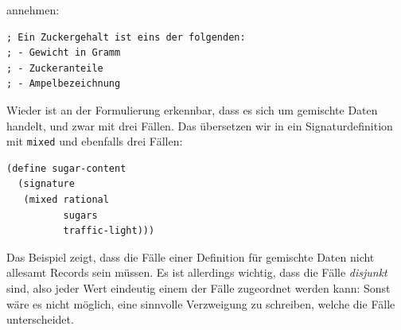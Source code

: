 annehmen:
%
\begin{verbatim}
; Ein Zuckergehalt ist eins der folgenden:
; - Gewicht in Gramm
; - Zuckeranteile
; - Ampelbezeichnung
\end{verbatim}
%
Wieder ist an der Formulierung erkennbar, dass es sich um gemischte
Daten handelt, und zwar mit drei Fällen.  Das übersetzen wir in ein
Signaturdefinition mit \texttt{mixed} und ebenfalls drei Fällen:
%
\begin{verbatim}
(define sugar-content
  (signature
   (mixed rational
          sugars
          traffic-light)))
\end{verbatim}
%
Das Beispiel zeigt, dass die Fälle einer Definition für gemischte Daten
nicht allesamt Records sein müssen.  Es ist allerdings wichtig, dass
die Fälle \emph{disjunkt} sind, also jeder Wert eindeutig einem der
Fälle zugeordnet werden kann: Sonst wäre es nicht möglich, eine sinnvolle
Verzweigung zu schreiben, welche die Fälle unterscheidet.

